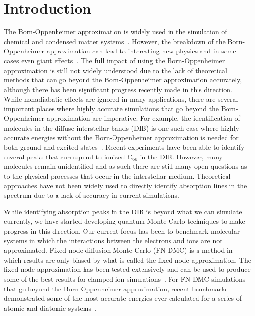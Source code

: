 \documentclass[aip,jcp,numerical,reprint]{revtex4-1}
\begin{document}
\section{Introduction}
The Born-Oppenheimer approximation is widely used in the simulation of chemical and condensed matter systems~\cite{Tubman_ECG,Martinez_Review,Cederbaum_Review}. However, the breakdown of the Born-Oppenheimer approximation can lead to interesting new physics and in some cases even giant effects~\cite{saitta2008,giustino2016}. The full impact of using the Born-Oppenheimer approximation is still not widely understood due to the lack of theoretical methods that can go beyond the Born-Oppenheimer approximation accurately, although there has been significant progress recently made in this direction\cite{Tubman_ECG,Yang2015,Sharon_NEO-HF,Sharon_XCNEO-HF1,Sharon_XCNEO-HF2,Sharon_XCNEO-HF,Kurt_XCNEO-HF,Kurt_XCNEO-HF1,Sharon_NEO-DFT,Sharon_NEO-DFT2,Sharon_NEO-DFT3,Gross_NEO-DFT,Gross_NEO-DFT1,Ilkka_Path,Ilkka_Path1,Ilkka_Path2,Ceperley_1987}.  While nonadiabatic effects are ignored in many applications, there are several important places where highly accurate simulations that go beyond the Born-Oppenheimer approximation are imperative.  For example, the identification of molecules in the diffuse interstellar bands (DIB) is one such case where highly accurate energies without the Born-Oppenheimer approximation is needed for both ground and excited states~\cite{snow2006}. Recent experiments have been able to identify several peaks that correspond to ionized C$_{60}$ in the DIB\cite{campbell2015}.  However, many molecules remain unidentified and as such there are still many open questions as to the physical processes that occur in the interstellar medium.   Theoretical approaches have not been widely used to directly identify absorption lines in the spectrum due to a lack of accuracy in current simulations.  

While identifying absorption peaks in the DIB is beyond what we can simulate currently, we have started developing quantum Monte Carlo techniques to make progress in this direction\cite{Tubman_ECG,Yang2015}.   Our current focus has been to benchmark molecular systems in which the interactions between the electrons and ions are not approximated.   Fixed-node diffusion Monte Carlo (FN-DMC) is a method in which results are only biased by what is called the fixed-node approximation.  %
The fixed-node approximation has been tested extensively and can be used to produce some of the best results for clamped-ion simulations~\cite{grossman1,Tubman_Release,Tubman_ACS}.  For FN-DMC simulations that go beyond the Born-Oppenheimer approximation, recent benchmarks demonstrated some of the most accurate energies ever calculated for a series of atomic and diatomic systems~\cite{Yang2015}.
\end{document}
